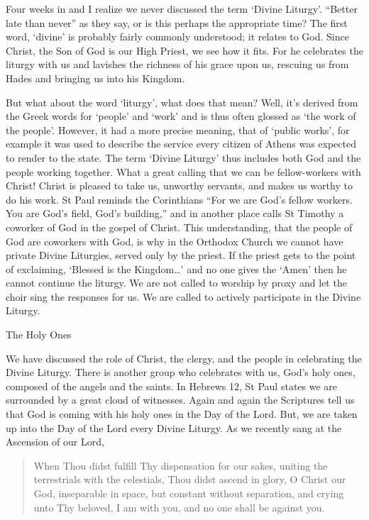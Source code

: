 \documentclass[
]{article}
\newcommand{\RL}[1]{\beginR #1\endR}
\begin{document}
Four weeks in and I realize we never discussed the term `Divine
Liturgy'. ``Better late than never'' as they say, or is this perhaps the
appropriate time? The first word, `divine' is probably fairly commonly
understood; it relates to God. Since Christ, the Son of God is our High
Priest, we see how it fits. For he celebrates the liturgy with us and
lavishes the richness of his grace upon us, rescuing us from Hades and
bringing us into his Kingdom.

But what about the word `liturgy', what does that mean? Well, it's
derived from the Greek words for `people' and `work' and is thus often
glossed as `the work of the people'. However, it had a more precise
meaning, that of `public works', for example it was used to describe the
service every citizen of Athens was expected to render to the state. The
term `Divine Liturgy' thus includes both God and the people working
together. What a great calling that we can be fellow-workers with
Christ! Christ is pleased to take us, unworthy servants, and makes us
worthy to do his work. St Paul reminds the Corinthians ``For we are
God\RL{'}s fellow workers. You are God\RL{'}s field, God\RL{'}s
building,'' and in another place calls St Timothy a coworker of God in
the gospel of Christ. This understanding, that the people of God are
coworkers with God, is why in the Orthodox Church we cannot have private
Divine Liturgies, served only by the priest. If the priest gets to the
point of exclaiming, `Blessed is the Kingdom\ldots{}' and no one gives
the `Amen' then he cannot continue the liturgy. We are not called to
worship by proxy and let the choir sing the responses for us. We are
called to actively participate in the Divine Liturgy.

The Holy Ones

We have discussed the role of Christ, the clergy, and the people in
celebrating the Divine Liturgy. There is another group who celebrates
with us, God's holy ones, composed of the angels and the saints. In
Hebrews 12, St Paul states we are surrounded by a great cloud of
witnesses. Again and again the Scriptures tell us that God is coming
with his holy ones in the Day of the Lord. But, we are taken up into the
Day of the Lord every Divine Liturgy. As we recently sang at the
Ascension of our Lord,

\begin{quote}
When Thou didst fulfill Thy dispensation for our sakes, uniting the
terrestrials with the celestials, Thou didst ascend in glory, O Christ
our God, inseparable in space, but constant without separation, and
crying unto Thy beloved, I am with you, and no one shall be against you.
\end{quote}
\end{document}
